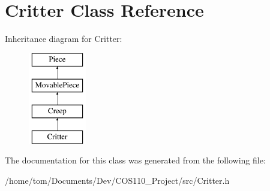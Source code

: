 \hypertarget{classCritter}{\section{Critter Class Reference}
\label{classCritter}
}
Inheritance diagram for Critter\-:\begin{figure}[H]
\begin{center}
\leavevmode
\includegraphics[height=4.000000cm]{classCritter}
\end{center}
\end{figure}


The documentation for this class was generated from the following file\-:\begin{DoxyCompactItemize}
\item 
/home/tom/\-Documents/\-Dev/\-C\-O\-S110\-\_\-\-Project/src/Critter.\-h\end{DoxyCompactItemize}

